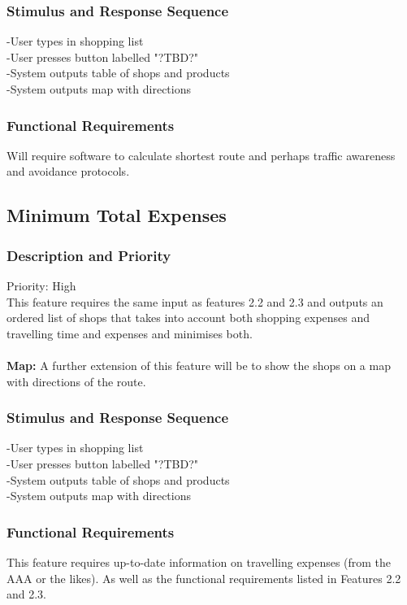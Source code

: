 \documentclass[12pt]{article}
\begin{document}
 \subsubsection{Stimulus and Response Sequence}
-User types in shopping list\\
-User presses button labelled "?TBD?"\\
-System outputs table of shops and products\\
-System outputs map with directions\\ \subsubsection{Functional Requirements}
Will require software to calculate shortest route and perhaps traffic awareness and avoidance  protocols.
 
 \subsection{Minimum Total Expenses}
\subsubsection{Description and Priority}
 Priority: High\\
 This feature requires the same input as features 2.2 and 2.3 and outputs an ordered list of shops that takes into account both shopping expenses and travelling time and expenses and minimises both. 
 \\\\
\textbf{Map:} A further extension of this feature will be to show the shops on a map with directions of the route.
 \subsubsection{Stimulus and Response Sequence}
 -User types in shopping list\\
-User presses button labelled "?TBD?"\\
-System outputs table of shops and products\\
-System outputs map with directions\\
 \subsubsection{Functional Requirements}
 This feature requires up-to-date information on travelling expenses (from the AAA or the likes).
 As well as the functional requirements listed in Features 2.2 and 2.3.
 \\
 \\
 \\
 \\
\end{document}
